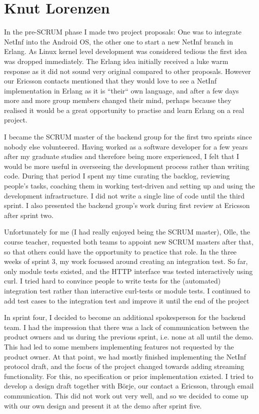 \section{Knut Lorenzen}

In the pre-SCRUM phase I made two project proposals: One was to integrate NetInf into the Android OS, the other one to start a new NetInf branch in Erlang. As Linux kernel level development was considered tedious the first idea was dropped immediately. The Erlang idea initially received a luke warm response as it did not sound very original compared to other proposals. However our Ericsson contacts mentioned that they would love to see a NetInf implementation in Erlang as it is ``their`` own language, and after a few days more and more group members changed their mind, perhaps because they realised it would be a great opportunity to practise and learn Erlang on a real project.

I became the SCRUM master of the backend group for the first two sprints since nobody else volunteered. Having worked as a software developer for a few years after my graduate studies and therefore being more experienced, I felt that I would be more useful in overseeing the development process rather than writing code. During that period I spent my time curating the backlog, reviewing people's tasks, coaching them in working test-driven and setting up and using the development infrastructure. I did not write a single line of code until the third sprint. I also presented the backend group's work during first review at Ericsson after sprint two.

Unfortunately for me (I had really enjoyed being the SCRUM master), Olle, the course teacher, requested both teams to appoint new SCRUM masters after that, so that others could have the opportunity to practice that role. In the three weeks of sprint 3, my work focussed around creating an integration test. So far, only module tests existed, and the HTTP interface was tested interactively using curl. I tried hard to convince people to write tests for the (automated) integration test rather than interactive curl-tests or module tests. I continued to add test cases to the integration test and improve it until the end of the project

In sprint four, I decided to become an additional spokesperson for the backend team. I had the impression that there was a lack of communication between the product owners and us during the previous sprint, i.e. none at all until the demo. This had led to some members implementing features not requested by the product owner. At that point, we had mostly finished implementing the NetInf protocol draft, and the focus of the project changed towards adding streaming functionality. For this, no specification or prior implementation existed. I tried to develop a design draft together with B\"orje, our contact a Ericsson, through email communication. This did not work out very well, and so we decided to come up with our own design and present it at the demo after sprint five.